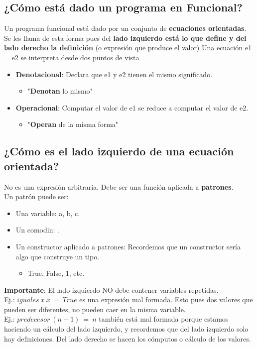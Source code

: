 \documentclass[10pt,a4paper]{article}
\begin{document}
\subsection*{¿Cómo está dado un programa en Funcional?}
Un programa funcional está dado por un conjunto de \textbf{ecuaciones orientadas}. Se les llama de esta forma pues del \textbf{lado izquierdo está lo que define y del lado derecho la definición} (o expresión que produce el valor)
Una ecuación e1 = e2 se interpreta desde dos puntos de vista
\begin{itemize}
    \item \textbf{Denotacional}: Declara que e1 y e2 tienen el mismo significado. 
    \begin{itemize}
        \item "\textbf{Denotan} lo mismo"
    \end{itemize}
    \item \textbf{Operacional}: Computar el valor de e1 se reduce a computar el valor de e2.
    \begin{itemize}
        \item "\textbf{Operan} de la misma forma"
    \end{itemize}
\end{itemize}
\subsection*{¿Cómo es el lado izquierdo de una ecuación orientada?}
No es una expresión arbitraria. Debe ser una función aplicada a \textbf{patrones}. \\
Un patrón puede ser: 
\begin{itemize}
    \item Una variable: a, b, c.
    \item Un comodin: \textunderscore. 
    \item Un constructor aplicado a patrones: Recordemos que un constructor sería algo que construye un tipo. 
    \begin{itemize}
        \item True, False, 1, etc.
    \end{itemize}
\end{itemize}
\textbf{Importante}: El lado izquierdo NO debe contener variables repetidas. \\
Ej.: $iguales \ x \ x \ = \ True$ es una expresión mal formada. Esto pues dos valores que pueden ser diferentes, no pueden caer en la misma variable. \\
Ej.: $predecesor \ (n+1) \ = \ n$ también está mal formada porque estamos haciendo un cálculo del lado izquierdo, y recordemos que del lado izquierdo solo hay definiciones. Del lado derecho se hacen los cómputos o cálculo de los valores.
\end{document}
